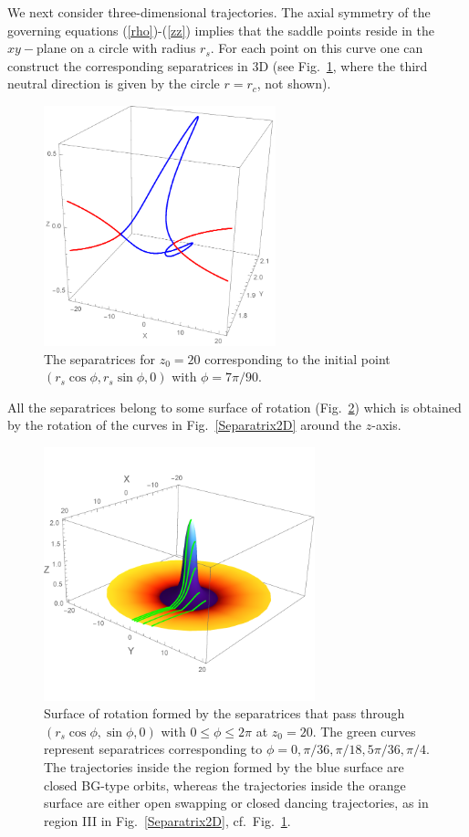 We next consider three-dimensional trajectories. The axial symmetry of the governing equations
(\ref{rho})-(\ref{zz})
implies that the saddle points reside in the $xy-$plane on a circle with radius $r_s$.
For each point on this curve one can construct the corresponding separatrices in 3D
(see Fig.~\ref{Separatrix3D}, where the third neutral direction is given by the circle $r=r_c$, not shown).
\begin{figure}%
  \centering
\includegraphics[width=0.6\textwidth]{Fig6.pdf}
\caption{The separatrices for $z_0=20$ corresponding to the
initial point $(r_s \cos\phi,r_s\sin\phi,0)$ with $\phi = 7\pi/90$.}
\label{Separatrix3D}
\end{figure}
All the separatrices belong to some surface of rotation (Fig.~\ref{Separatrix3D_polar}) which is obtained by the rotation of the curves in Fig.~\ref{Separatrix2D} around the $z$-axis.
\begin{figure}%
  \centering
\includegraphics[width=0.7\textwidth]{Fig7.pdf}
\caption{Surface of rotation formed by the separatrices that pass through  $(r_s \cos\phi, \sin\phi,0)$ with $0\leq \phi\leq 2\pi$ at $z_0=20$. The green curves represent separatrices corresponding to $\phi = 0,\pi/36,\pi/18,5\pi/36,\pi/4$. The trajectories inside the region formed by the blue surface are closed BG-type orbits, whereas the trajectories inside the orange surface are either open swapping or closed dancing trajectories, as in region III in Fig.~\ref{Separatrix2D}, cf.\ Fig.~\ref{Separatrix3D}.}
\label{Separatrix3D_polar}
\end{figure}

